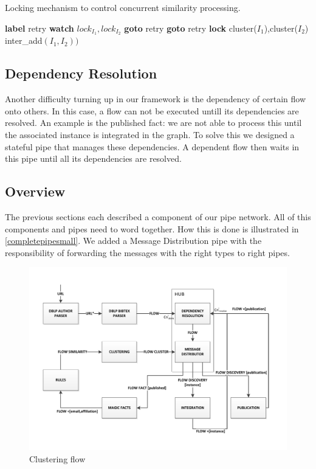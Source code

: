 \begin{algorithm}
\caption{Locking mechanism to control concurrent similarity processing.}
\label{locking}
\begin{algorithmic}
  \STATE \textbf{label} retry
  \STATE \textbf{watch} ${lock}_{I_1},{lock}_{I_2}$
  \STATE \textbf{goto} retry
    \STATE \textbf{goto} retry
  \ENDIF
\ELSE
  \STATE \textbf{lock} cluster($I_1$),cluster($I_2$)
  \STATE inter\_add$(I_1,I_2))$
\ENDIF
\end{algorithmic}
\end{algorithm}

\subsection{Dependency Resolution}
\label{dependencies}

Another difficulty turning up in our framework is the dependency of certain flow onto others. In this case, a flow can not be executed untill its dependencies are resolved. An example is the published fact: we are not able to process this until the associated instance is integrated in the graph. To solve this we designed a stateful pipe that manages these dependencies. A dependent flow then waits in this pipe until all its dependencies are resolved.

\subsection{Overview}

The previous sections each described a component of our pipe network. All of this components and pipes need to word together. How this is done is illustrated in \autoref{completepipesmall}. We added a Message Distribution pipe with the responsibility of forwarding the messages with the right types to right pipes.

\begin{figure}[htb]
	\centering
		\includegraphics[width=1\textwidth]{fig/completepipesmall}
	\caption{Clustering flow}
	\label{fig:completepipesmall}
\end{figure}


